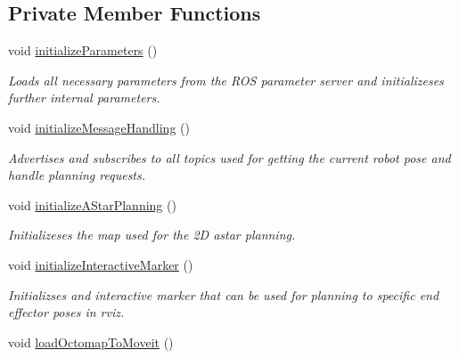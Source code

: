 \subsection*{Private Member Functions}
\begin{DoxyCompactItemize}
\item 
\hypertarget{classSquirrelMotionPlanner_1_1Planner_a71457b2533a3684dfacc377a991096ea}{void \hyperlink{classSquirrelMotionPlanner_1_1Planner_a71457b2533a3684dfacc377a991096ea}{initialize\-Parameters} ()}\label{classSquirrelMotionPlanner_1_1Planner_a71457b2533a3684dfacc377a991096ea}

\begin{DoxyCompactList}\small\item\em Loads all necessary parameters from the R\-O\-S parameter server and initializeses further internal parameters. \end{DoxyCompactList}\item 
\hypertarget{classSquirrelMotionPlanner_1_1Planner_a10ab2a3d7cd966ba65606109d0284992}{void \hyperlink{classSquirrelMotionPlanner_1_1Planner_a10ab2a3d7cd966ba65606109d0284992}{initialize\-Message\-Handling} ()}\label{classSquirrelMotionPlanner_1_1Planner_a10ab2a3d7cd966ba65606109d0284992}

\begin{DoxyCompactList}\small\item\em Advertises and subscribes to all topics used for getting the current robot pose and handle planning requests. \end{DoxyCompactList}\item 
\hypertarget{classSquirrelMotionPlanner_1_1Planner_a8d867020888b975aed450643b066eccf}{void \hyperlink{classSquirrelMotionPlanner_1_1Planner_a8d867020888b975aed450643b066eccf}{initialize\-A\-Star\-Planning} ()}\label{classSquirrelMotionPlanner_1_1Planner_a8d867020888b975aed450643b066eccf}

\begin{DoxyCompactList}\small\item\em Initializeses the map used for the 2\-D astar planning. \end{DoxyCompactList}\item 
\hypertarget{classSquirrelMotionPlanner_1_1Planner_a58fec3f4e3ddf1dde94c78aeddc2bf6c}{void \hyperlink{classSquirrelMotionPlanner_1_1Planner_a58fec3f4e3ddf1dde94c78aeddc2bf6c}{initialize\-Interactive\-Marker} ()}\label{classSquirrelMotionPlanner_1_1Planner_a58fec3f4e3ddf1dde94c78aeddc2bf6c}

\begin{DoxyCompactList}\small\item\em Initializses and interactive marker that can be used for planning to specific end effector poses in rviz. \end{DoxyCompactList}\item 
\hypertarget{classSquirrelMotionPlanner_1_1Planner_a47e7dde8c4854ad9aa13a16ff13046b8}{void \hyperlink{classSquirrelMotionPlanner_1_1Planner_a47e7dde8c4854ad9aa13a16ff13046b8}{load\-Octomap\-To\-Moveit} ()}\label{classSquirrelMotionPlanner_1_1Planner_a47e7dde8c4854ad9aa13a16ff13046b8}


\end{DoxyCompactItemize}
